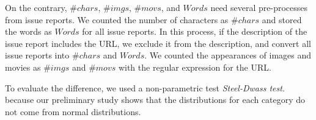 On the contrary, $\#chars$, $\#imgs$, $\#movs$, and $Words$ need several pre-processes from issue reports.  We counted the number of characters as $\#chars$ and stored the words as $Words$ for all issue reports. In this process, if the description of the issue report includes the URL, we exclude it from the description, and convert all issue reports into $\#chars$ and $Words$.
We counted the appearances of images and movies as $\#imgs$ and $\#movs$ with the regular expression for the URL.



To evaluate the difference, we used a non-parametric test \textit{Steel-Dwass test}.
because our preliminary study shows that 
the distributions for each category do not 
come from normal distributions.
